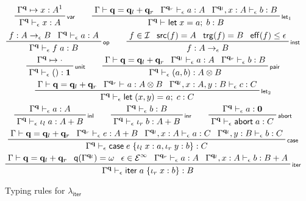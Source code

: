 \documentclass[acmsmall,screen,review]{acmart}
\newcommand{\mc}[1]{\ensuremath{\mathcal{#1}}}
\newcommand{\mb}[1]{\ensuremath{\mathbf{#1}}}
\newcommand{\ms}[1]{\ensuremath{\mathsf{#1}}}
\newcommand{\lto}{:}
\newcommand{\linl}[1]{\iota_l\;{#1}}
\newcommand{\linr}[1]{\iota_r\;{#1}}
\newcommand{\labort}[1]{\ms{abort}\;{#1}}
\newcommand{\letexpr}[3]{\ensuremath{\ms{let}\;#1 = #2;\;#3}}
\newcommand{\caseexpr}[5]{\ms{case}\;#1\;\{\linl{#2} \lto #3, \linr{#4} \lto #5\}}
\newcommand{\liter}[3]{\ms{iter}\;#1\;\{ \linr{#2} \lto #3 \}}
\newcommand{\einf}[1]{#1 \in \mc{E}^\infty}
\newcommand{\qsp}[4]{#1 \vdash #2 = #3 + #4}
\newcommand{\cwk}[2]{#1 \mapsto #2}
\newcommand{\rle}[1]{{\scriptsize\textsf{#1}}}
\newcommand{\hasty}[4]{#1 \vdash_{#2} #3: {#4}}
\newcommand{\subiterexp}{\texorpdfstring{\(\lambda_{\ms{iter}}\)}{lambda-iter}}
\newcommand{\oneq}{1}
\newcommand{\topq}{\omega}
\newcommand{\alquant}{\ms{q}}
\begin{document}
\begin{figure}
  \begin{adjustbox}{minipage=1.1\textwidth,scale=0.9}
  \begin{gather*}
    \prftree[r]{\rle{var}}
      {\cwk{\Gamma^{\mb{q}}}{x : A^\oneq}}
        {\hasty{\Gamma^{\mb{q}}}{\epsilon}{x}{A}} 
      \qquad
    \prftree[r]{\rle{let$_1$}}{\qsp{\Gamma}{\mb{q}}{\mb{q}_l}{\mb{q}_r}}
      {\hasty{\Gamma^{\mb{q}_r}}{\epsilon}{a}{A}}
      {\hasty{\Gamma^{\mb{q}_l}, x : A}{\epsilon}{b}{B}}
      {\hasty{\Gamma^{\mb{q}}}{}{\letexpr{x}{a}{b}}{B}}
      \\
    \prftree[r]{\rle{op}}{f : A \to_\epsilon B}
      {\hasty{\Gamma^{\mb{q}}}{\epsilon}{a}{A}}
      {\hasty{\Gamma^{\mb{q}}}{\epsilon}{f\;a}{B}}
      \qquad
    \prftree[r]{\rle{inst}}
      {f \in \mc{I}}
      {\ms{src}(f) = A}
      {\ms{trg}(f) = B}
      {\ms{eff}(f) \leq \epsilon}
      {f : A \to_\epsilon B}
      \\
    \prftree[r]{\rle{unit}}
      {\cwk{\Gamma^{\mb{q}}}{\cdot}}{\hasty{\Gamma^{\mb{q}}}{\epsilon}{()}{\mb{1}}} 
      \qquad
    \prftree[r]{\rle{pair}}{\qsp{\Gamma}{\mb{q}}{\mb{q}_l}{\mb{q}_r}}
      {\hasty{\Gamma^{\mb{q}_l}}{\epsilon}{a}{A}}
      {\hasty{\Gamma^{\mb{q}_r}}{\epsilon}{b}{B}}
      {\hasty{\Gamma^{\mb{q}}}{\epsilon}{(a, b)}{A \otimes B}} \\
    \prftree[r]{\rle{let$_2$}}{\qsp{\Gamma}{\mb{q}}{\mb{q}_l}{\mb{q}_r}}
      {\hasty{\Gamma^{\mb{q}_r}}{}{a}{A \otimes B}}
      {\hasty{\Gamma^{\mb{q}_l}, x : A, y : B}{\epsilon}{c}{C}}
      {\hasty{\Gamma^{\mb{q}}}{\epsilon}{\letexpr{(x, y)}{a}{c}}{C}}
      \\
    \prftree[r]{\rle{inl}}
      {\hasty{\Gamma^{\mb{q}}}{\epsilon}{a}{A}}
      {\hasty{\Gamma^{\mb{q}}}{\epsilon}{\linl{a}}{A + B}} \qquad
    \prftree[r]{\rle{inr}}
      {\hasty{\Gamma^{\mb{q}}}{\epsilon}{b}{B}}
      {\hasty{\Gamma^{\mb{q}}}{\epsilon}{\linr{b}}{A + B}} \qquad    
    \prftree[r]{\rle{abort}}
      {\hasty{\Gamma^{\mb{q}}}{\epsilon}{a}{\mb{0}}}
      {\hasty{\Gamma^{\mb{q}}}{\epsilon}{\labort{a}}{C}}
      \\
    \prftree[r]{\rle{case}}{\qsp{\Gamma}{\mb{q}}{\mb{q}_l}{\mb{q}_r}}
      {\hasty{\Gamma^{\mb{q}_r}}{\epsilon}{e}{A + B}}
      {\hasty{\Gamma^{\mb{q}_l}, x : A}{\epsilon}{a}{C}}
      {\hasty{\Gamma^{\mb{q}_l}, y : B}{\epsilon}{b}{C}}
      {\hasty{\Gamma^{\mb{q}}}{\epsilon}{\caseexpr{e}{x}{a}{y}{b}}{C}} \\
    \prftree[r]{\rle{iter}}
      {\qsp{\Gamma}{\mb{q}}{\mb{q}_l}{\mb{q}_r}}
      {\alquant(\Gamma^{\mb{q}_l}) = \topq}
      {\einf{\epsilon}}
      {\hasty{\Gamma^{\mb{q}_r}}{\epsilon}{a}{A}}
      {\hasty{\Gamma^{\mb{q}_l}, x : A}{\epsilon}{b}{B + A}}
      {\hasty{\Gamma^{\mb{q}}}{\epsilon}{\liter{a}{x}{b}}{B}}
  \end{gather*}
  \end{adjustbox}
  \caption{Typing rules for \subiterexp{}}
  \Description{}
  \label{fig:expr-typing}
\end{figure}
\end{document}
